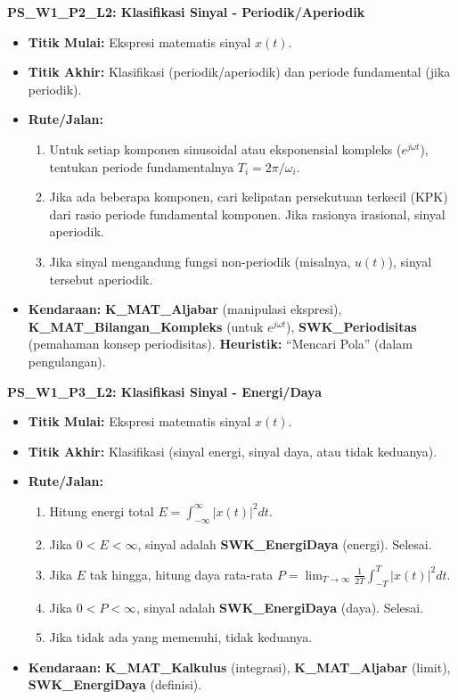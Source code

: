 \documentclass[
  letterpaper,
  DIV=11,
  numbers=noendperiod]{scrreprt}
\providecommand{\tightlist}{%
  \setlength{\itemsep}{0pt}\setlength{\parskip}{0pt}}
\begin{document}
\textbf{PS\_W1\_P2\_L2: Klasifikasi Sinyal - Periodik/Aperiodik}

\begin{itemize}
\tightlist
\item
  \textbf{Titik Mulai:} Ekspresi matematis sinyal \(x(t)\).
\item
  \textbf{Titik Akhir:} Klasifikasi (periodik/aperiodik) dan periode
  fundamental (jika periodik).
\item
  \textbf{Rute/Jalan:}

  \begin{enumerate}
  \def\labelenumi{\arabic{enumi}.}
  \tightlist
  \item
    Untuk setiap komponen sinusoidal atau eksponensial kompleks
    (\(e^{j\omega t}\)), tentukan periode fundamentalnya
    \(T_i = 2\pi / \omega_i\).
  \item
    Jika ada beberapa komponen, cari kelipatan persekutuan terkecil
    (KPK) dari rasio periode fundamental komponen. Jika rasionya
    irasional, sinyal aperiodik.
  \item
    Jika sinyal mengandung fungsi non-periodik (misalnya, \(u(t)\)),
    sinyal tersebut aperiodik.
  \end{enumerate}
\item
  \textbf{Kendaraan:} \textbf{K\_MAT\_Aljabar} (manipulasi ekspresi),
  \textbf{K\_MAT\_Bilangan\_Kompleks} (untuk \(e^{j\omega t}\)),
  \textbf{SWK\_Periodisitas} (pemahaman konsep periodisitas).
  \textbf{Heuristik:} ``Mencari Pola'' (dalam pengulangan).
\end{itemize}

\textbf{PS\_W1\_P3\_L2: Klasifikasi Sinyal - Energi/Daya}

\begin{itemize}
\tightlist
\item
  \textbf{Titik Mulai:} Ekspresi matematis sinyal \(x(t)\).
\item
  \textbf{Titik Akhir:} Klasifikasi (sinyal energi, sinyal daya, atau
  tidak keduanya).
\item
  \textbf{Rute/Jalan:}

  \begin{enumerate}
  \def\labelenumi{\arabic{enumi}.}
  \tightlist
  \item
    Hitung energi total \(E = \int_{-\infty}^{\infty} |x(t)|^2 dt\).
  \item
    Jika \(0 < E < \infty\), sinyal adalah \textbf{SWK\_EnergiDaya}
    (energi). Selesai.
  \item
    Jika \(E\) tak hingga, hitung daya rata-rata
    \(P = \lim_{T \to \infty} \frac{1}{2T} \int_{-T}^{T} |x(t)|^2 dt\).
  \item
    Jika \(0 < P < \infty\), sinyal adalah \textbf{SWK\_EnergiDaya}
    (daya). Selesai.
  \item
    Jika tidak ada yang memenuhi, tidak keduanya.
  \end{enumerate}
\item
  \textbf{Kendaraan:} \textbf{K\_MAT\_Kalkulus} (integrasi),
  \textbf{K\_MAT\_Aljabar} (limit), \textbf{SWK\_EnergiDaya} (definisi).
\end{itemize}
\end{document}

